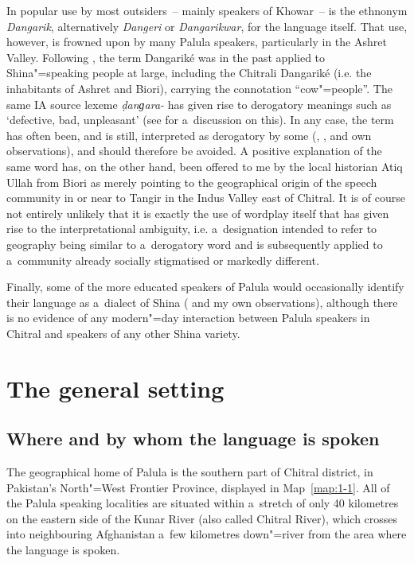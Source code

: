 In popular use by most outsiders~-- mainly speakers of Khowar~-- is the ethnonym \textit{Dangarik},
alternatively \textit{Dangeri} or \textit{Dangarikwar}, for the language itself. That use, however,
is frowned upon by many Palula speakers, particularly in the Ashret Valley. Following
\citet[113]{biddulph1986}, the term Dangariké was in the past applied to Shina"=speaking people at
large, including the Chitrali Dangariké (i.e. the inhabitants of Ashret and Biori), carrying the
connotation ``cow"=people''. The same IA source lexeme \textit{ḍanɡara-}
\citep[5526, 5524]{turner1966} has given rise to derogatory meanings such as `defective, bad,
unpleasant' (see \citealt[81]{cacopardo2001} for a~discussion on this). In any case, the term has
often been, and is still, interpreted as derogatory by some (\citealt[69]{decker1992a},
\citeyear[160]{decker1996}, and own observations), and should therefore be avoided. A positive
explanation of the same word has, on the other hand, been offered to me by the local historian Atiq
Ullah from Biori as merely pointing to the geographical origin of the speech community in or near to
Tangir in the Indus Valley east of Chitral. It is of course not entirely unlikely that it is exactly
the use of wordplay itself that has given rise to the interpretational ambiguity, i.e. a~designation
intended to refer to geography being similar to a~derogatory word and is subsequently applied to
a~community already socially stigmatised or markedly different.


Finally, some of the more educated speakers of Palula would occasionally identify their language as a~dialect of Shina (\citealt[82]{decker1992a} and my own observations), although there is no evidence of any modern"=day interaction between Palula speakers in Chitral and speakers of any other Shina variety. 

\section{The general setting}
\label{sec:1-2}
\subsection{Where and by whom the language is spoken}
\label{subsec:1-2-1}

The geographical home of Palula is the southern part of Chitral district, in Pakistan's North"=West
Frontier Province, displayed in Map~\ref{map:1-1}. All of the Palula speaking localities are
situated within a~stretch of only 40 kilometres on the eastern side of the Kunar River (also called
Chitral River), which crosses into neighbouring Afghanistan a~few kilometres down"=river from the
area where the language is spoken.


